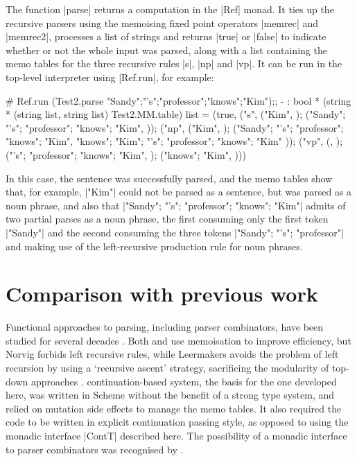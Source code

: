The function |parse| returns a computation in the |Ref| monad. It ties up the 
recursive parsers using the memoising fixed point
operators |memrec| and |memrec2|, processes a list of strings and returns |true| or |false| to 
indicate whether or not the whole input was parsed, along with a list containing the
memo tables for the three recursive rules |s|, |np| and |vp|. It can be run in the 
\OCaml top-level interpreter using
|Ref.run|, for example:
\begin{ocaml-tt}
	# Ref.run (Test2.parse {"Sandy";"'s";"professor";"knows";"Kim"});;
	- : bool * (string * (string list, string list) Test2.MM.table) list =
	(true,
	 {("s", {({"Kim"}, {});
				   ({"Sandy"; "'s"; "professor"; "knows"; "Kim"}, { {} })});
	  ("np", {({"Kim"}, { {} });
				    ({"Sandy"; "'s"; "professor"; "knows"; "Kim"},
				     { {"knows"; "Kim"}; 
				       {"'s"; "professor"; "knows"; "Kim"} })});
	  ("vp", {({}, {}); 
				    ({"'s"; "professor"; "knows"; "Kim"}, {});
				    ({"knows"; "Kim"}, { {} })})})
\end{ocaml-tt}
In this case, the sentence was successfully parsed, and the memo tables show that,
for example, |{"Kim"}| could not be parsed as a sentence, but was 
parsed as a noun phrase, and also that |{"Sandy"; "'s"; "professor"; "knows"; "Kim"}|
admits of two partial parses as a noun phrase, the first consuming only the first token
|"Sandy"| and the second consuming the three tokens |{"Sandy"; "'s"; "professor"}|
and making use of the left-recursive production rule for noun phrases.

\section{Comparison with previous work}
\label{s:comparison}

Functional approaches to parsing, including parser combinators,
have been studied
for several decades \cite{Burge1975,Fairbairn1987,FrostLaunchbury1989,Hutton1990}. Both \citet{Norvig1991}
and \citet{Leermakers1993} use memoisation to improve efficiency, but Norvig
forbids left recursive rules, while Leermakers avoids the problem of left recursion
by using a `recursive ascent' strategy, sacrificing the modularity of top-down approaches
\cite{Koskimies1990}.  continuation-based system,
the basis for the one developed here,
was written in Scheme without the benefit of a strong type system, and relied
on mutation side effects to manage the memo tables. It also required 
the code to be written in explicit continuation passing style, as opposed 
to using the monadic interface |ContT| described here. The possibility of a monadic interface to
parser combinators was recognised by \citet{Wadler1990}.


